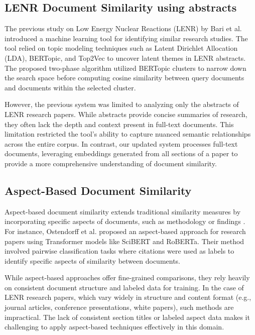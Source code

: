\documentclass[12pt]{article}
\begin{document}
    \subsection{LENR Document Similarity using abstracts}
    
    The previous study on Low Energy Nuclear Reactions (LENR) by Bari et al. \cite{bari2024exploring} introduced a machine learning tool for identifying similar research studies. The tool relied on topic modeling techniques such as Latent Dirichlet Allocation (LDA), BERTopic, and Top2Vec to uncover latent themes in LENR abstracts. The proposed two-phase algorithm utilized BERTopic clusters to narrow down the search space before computing cosine similarity between query documents and documents within the selected cluster.
    
    However, the previous system was limited to analyzing only the abstracts of LENR research papers. While abstracts provide concise summaries of research, they often lack the depth and context present in full-text documents. This limitation restricted the tool's ability to capture nuanced semantic relationships across the entire corpus. In contrast, our updated system processes full-text documents, leveraging embeddings generated from all sections of a paper to provide a more comprehensive understanding of document similarity.
    
    \subsection{Aspect-Based Document Similarity}
    
    Aspect-based document similarity extends traditional similarity measures by incorporating specific aspects of documents, such as methodology or findings \cite{ostendorff2020aspect}. For instance, Ostendorff et al. \cite{ostendorff2020aspect} proposed an aspect-based approach for research papers using Transformer models like SciBERT and RoBERTa. Their method involved pairwise classification tasks where citations were used as labels to identify specific aspects of similarity between documents.
    
    While aspect-based approaches offer fine-grained comparisons, they rely heavily on consistent document structure and labeled data for training. In the case of LENR research papers, which vary widely in structure and content format (e.g., journal articles, conference presentations, white papers), such methods are impractical. The lack of consistent section titles or labeled aspect data makes it challenging to apply aspect-based techniques effectively in this domain.
    
\end{document}

